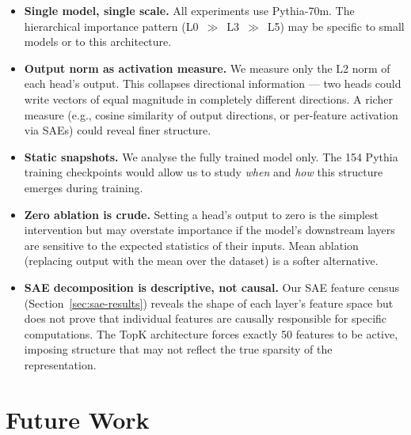 \documentclass[11pt,a4paper]{article}
\begin{document}
\begin{itemize}[itemsep=2pt]
    \item \textbf{Single model, single scale.} All experiments use Pythia-70m. The hierarchical importance pattern (L0~$\gg$~L3~$\gg$~L5) may be specific to small models or to this architecture.
    \item \textbf{Output norm as activation measure.} We measure only the L2 norm of each head's output. This collapses directional information --- two heads could write vectors of equal magnitude in completely different directions. A richer measure (e.g., cosine similarity of output directions, or per-feature activation via SAEs) could reveal finer structure.
    \item \textbf{Static snapshots.} We analyse the fully trained model only. The 154 Pythia training checkpoints would allow us to study \emph{when} and \emph{how} this structure emerges during training.
    \item \textbf{Zero ablation is crude.} Setting a head's output to zero is the simplest intervention but may overstate importance if the model's downstream layers are sensitive to the expected statistics of their inputs. Mean ablation (replacing output with the mean over the dataset) is a softer alternative.
    \item \textbf{SAE decomposition is descriptive, not causal.} Our SAE feature census (Section~\ref{sec:sae-results}) reveals the shape of each layer's feature space but does not prove that individual features are causally responsible for specific computations. The TopK architecture forces exactly 50 features to be active, imposing structure that may not reflect the true sparsity of the representation.
\end{itemize}

\section{Future Work}
\label{sec:future}
\end{document}
